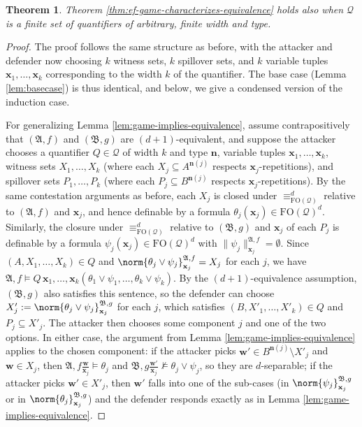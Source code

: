\documentclass{article}
\newtheorem{theorem}{Theorem}[section]
\theoremstyle{definition}
\begin{document}
\begin{theorem}
    Theorem \ref{thm:ef-game-characterizes-equivalence} holds also when $\mathcal{Q}$ is a finite set of quantifiers of arbitrary, finite width and type.
\end{theorem}

\begin{proof}
    The proof follows the same structure as before, with the attacker and defender now choosing $k$ witness sets, $k$ spillover sets, and $k$ variable tuples $\mathbf{x}_1,\ldots,\mathbf{x}_k$ corresponding to the width $k$ of the quantifier. The base case (Lemma \ref{lem:basecase}) is thus identical, and below, we give a condensed version of the induction case.

    For generalizing Lemma \ref{lem:game-implies-equivalence}, assume contrapositively that $(\mathfrak{A},f)$ and $(\mathfrak{B},g)$ are $(d+1)$-equivalent, and suppose the attacker chooses a quantifier $Q\in\mathcal{Q}$ of width $k$ and type $\mathbf{n}$, variable tuples $\mathbf{x}_1,\ldots,\mathbf{x}_k$, witness sets $X_1,\ldots,X_k$ (where each $X_j\subseteq A^{\mathbf{n}(j)}$ respects $\textbf{x}_j$-repetitions), and spillover sets $P_1,\ldots,P_k$ (where each $P_j\subseteq B^{\mathbf{n}(j)}$ respects $\textbf{x}_j$-repetitions). By the same contestation arguments as before, each $X_j$ is closed under $\equiv^d_{\mathrm{FO}(\mathcal{Q})}$ relative to $(\mathfrak{A},f)$ and $\mathbf{x}_j$, and hence definable by a formula $\theta_j(\mathbf{x}_j)\in\mathrm{FO}(\mathcal{Q})^d$. Similarly, the closure under $\equiv^d_{\mathrm{FO}(\mathcal{Q})}$ relative to $(\mathfrak{B},g)$ and $\textbf{x}_j$ of each $P_j$ is definable by a formula $\psi_j(\mathbf{x}_j)\in\mathrm{FO}(\mathcal{Q})^d$ with $\|\psi_j\|^{\mathfrak{A},f}_{\mathbf{x}_j}=\emptyset$. Since $(A,X_1,\ldots,X_k)\in Q$ and $\norm{\theta_j\lor\psi_j}^{\mathfrak{A},f}_{\mathbf{x}_j}=X_j$ for each $j$, we have $\mathfrak{A},f\models Q\,\mathbf{x}_1,\ldots,\mathbf{x}_k(\theta_1 \lor\psi_1,\ldots,\theta_k\lor\psi_k)$. By the $(d+1)$-equivalence assumption, $(\mathfrak{B},g)$ also satisfies this sentence, so the defender can choose $X'_j:=\norm{\theta_j\lor\psi_j}^{\mathfrak{B},g}_{\mathbf{x}_j}$ for each $j$, which satisfies $(B,X'_1,\ldots,X'_k)\in Q$ and $P_j\subseteq X'_j$. The attacker then chooses some component $j$ and one of the two options. In either case, the argument from Lemma \ref{lem:game-implies-equivalence} applies to the chosen component: if the attacker picks $\mathbf{w}'\in B^{\mathbf{n}(j)}\setminus X'_j$ and $\mathbf{w}\in X_j$, then $\mathfrak{A},f\frac{\mathbf{w}}{\mathbf{x}_j}\models\theta_j$ and $\mathfrak{B},g\frac{\mathbf{w}'}{\mathbf{x}_j}\not\models \theta_j\lor\psi_j$, so they are $d$-separable; if the attacker picks $\mathbf{w}'\in X'_j$, then $\mathbf{w}'$ falls into one of the sub-cases (in $\norm{\psi_j}^{\mathfrak{B},g}_{\textbf{x}_j}$ or in $\norm{\theta_j}^{\mathfrak{B},g}_{\textbf{x}_j}$) and the defender responds exactly as in Lemma \ref{lem:game-implies-equivalence}.


\end{proof}
\end{document}
